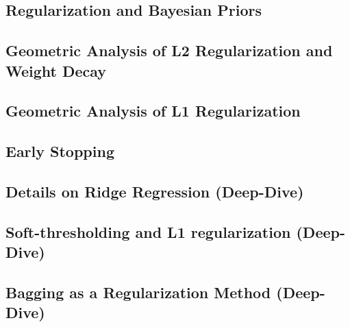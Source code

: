 \subsection{Regularization and Bayesian Priors}


\subsection{Geometric Analysis of L2 Regularization and Weight Decay}


\subsection{Geometric Analysis of L1 Regularization}


\subsection{Early Stopping}


\subsection{Details on Ridge Regression (Deep-Dive)}


\subsection{Soft-thresholding and L1 regularization (Deep-Dive)}


\subsection{Bagging as a Regularization Method (Deep-Dive)}







